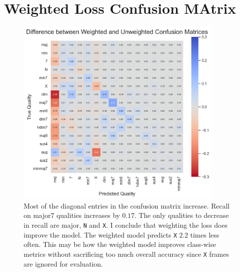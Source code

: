 \section{Weighted Loss Confusion MAtrix}\label{app:weighted_loss_confusion_matrix}

\begin{figure}[H]
    \centering
    \hspace{-1.5cm}
    \includegraphics[width=0.9\textwidth]{figures/confusion_matrix_difference.png}
    \caption{ Most of the diagonal entries in the confusion matrix increase. Recall on major7 qualities increases by $0.17$. The only qualities to decrease in recall are major, \texttt{N} and \texttt{X}. I conclude that weighting the loss does improve the model. The weighted model predicts \texttt{X} $2.2$ times less often. This may be how the weighted model improves class-wise metrics without sacrificing too much overall accuracy since \texttt{X} frames are ignored for evaluation.}\label{fig:hmm_smoothing_example}
\end{figure}

